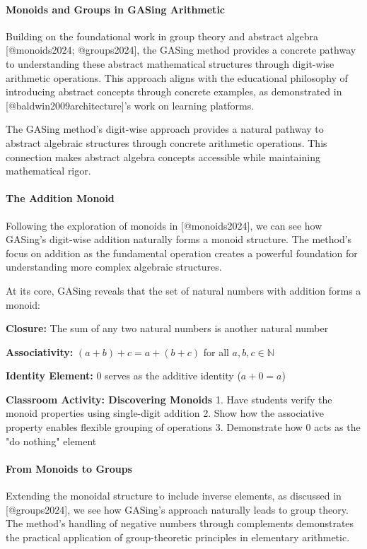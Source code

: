 \paragraph{Monoids and Groups in GASing Arithmetic}

Building on the foundational work in group theory and abstract algebra [@monoids2024; @groups2024], the GASing method provides a concrete pathway to understanding these abstract mathematical structures through digit-wise arithmetic operations. This approach aligns with the educational philosophy of introducing abstract concepts through concrete examples, as demonstrated in [@baldwin2009architecture]'s work on learning platforms.

The GASing method's digit-wise approach provides a natural pathway to abstract algebraic structures through concrete arithmetic operations. This connection makes abstract algebra concepts accessible while maintaining mathematical rigor.
\paragraph{The Addition Monoid}

Following the exploration of monoids in [@monoids2024], we can see how GASing's digit-wise addition naturally forms a monoid structure. The method's focus on addition as the fundamental operation creates a powerful foundation for understanding more complex algebraic structures.

At its core, GASing reveals that the set of natural numbers with addition forms a monoid:


\noindent\textbf{\textbf{Closure}:} The sum of any two natural numbers is another natural number


\noindent\textbf{\textbf{Associativity}:} $(a + b) + c = a + (b + c)$ for all $a, b, c \in \mathbb{N}$


\noindent\textbf{\textbf{Identity Element}:} $0$ serves as the additive identity ($a + 0 = a$)


\textbf{Classroom Activity: Discovering Monoids}
1. Have students verify the monoid properties using single-digit addition
2. Show how the associative property enables flexible grouping of operations
3. Demonstrate how 0 acts as the "do nothing" element
\paragraph{From Monoids to Groups}

Extending the monoidal structure to include inverse elements, as discussed in [@groups2024], we see how GASing's approach naturally leads to group theory. The method's handling of negative numbers through complements demonstrates the practical application of group-theoretic principles in elementary arithmetic.

